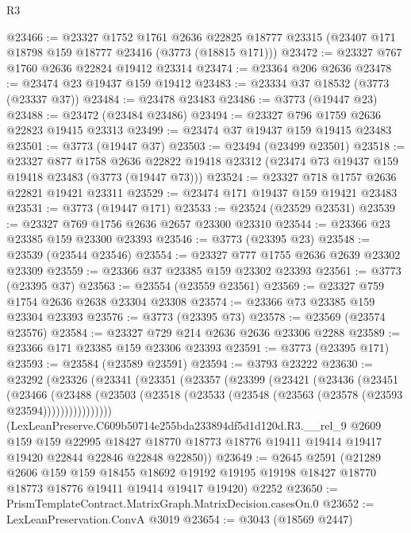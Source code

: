 \begin{lexlean}{R3}
\begin{coremodule}
@23466 := @23327
    @1752
    @1761
    @2636
    @22825
    @18777
    @23315
    (@23407 @171 @18798 @159 @18777 @23416 (@3773 (@18815 @171)))
@23472 := @23327 @767 @1760 @2636 @22824 @19412 @23314
@23474 := @23364 @206 @2636
@23478 := @23474 @23 @19437 @159 @19412
@23483 := @23334 @37 @18532 (@3773 (@23337 @37))
@23484 := @23478 @23483
@23486 := @3773 (@19447 @23)
@23488 := @23472 (@23484 @23486)
@23494 := @23327 @796 @1759 @2636 @22823 @19415 @23313
@23499 := @23474 @37 @19437 @159 @19415 @23483
@23501 := @3773 (@19447 @37)
@23503 := @23494 (@23499 @23501)
@23518 := @23327
    @877
    @1758
    @2636
    @22822
    @19418
    @23312
    (@23474 @73 @19437 @159 @19418 @23483 (@3773 (@19447 @73)))
@23524 := @23327 @718 @1757 @2636 @22821 @19421 @23311
@23529 := @23474 @171 @19437 @159 @19421 @23483
@23531 := @3773 (@19447 @171)
@23533 := @23524 (@23529 @23531)
@23539 := @23327 @769 @1756 @2636 @2657 @23300 @23310
@23544 := @23366 @23 @23385 @159 @23300 @23393
@23546 := @3773 (@23395 @23)
@23548 := @23539 (@23544 @23546)
@23554 := @23327 @777 @1755 @2636 @2639 @23302 @23309
@23559 := @23366 @37 @23385 @159 @23302 @23393
@23561 := @3773 (@23395 @37)
@23563 := @23554 (@23559 @23561)
@23569 := @23327 @759 @1754 @2636 @2638 @23304 @23308
@23574 := @23366 @73 @23385 @159 @23304 @23393
@23576 := @3773 (@23395 @73)
@23578 := @23569 (@23574 @23576)
@23584 := @23327 @729 @214 @2636 @2636 @23306 @2288
@23589 := @23366 @171 @23385 @159 @23306 @23393
@23591 := @3773 (@23395 @171)
@23593 := @23584 (@23589 @23591)
@23594 := @3793 @23222
@23630 := @23292
    (@23326
      (@23341
        (@23351
          (@23357
            (@23399
              (@23421
                (@23436
                  (@23451
                    (@23466
                      (@23488
                        (@23503
                          (@23518 (@23533 (@23548 (@23563 (@23578 (@23593 @23594))))))))))))))))
      (LexLeanPreserve.C609b50714e255bda233894df5d1d120d.R3.__rel_9
        @2609
        @159
        @159
        @22995
        @18427
        @18770
        @18773
        @18776
        @19411
        @19414
        @19417
        @19420
        @22844
        @22846
        @22848
        @22850))
@23649 := @2645
    @2591
    (@21289
      @2606
      @159
      @159
      @18455
      @18692
      @19192
      @19195
      @19198
      @18427
      @18770
      @18773
      @18776
      @19411
      @19414
      @19417
      @19420)
    @2252
@23650 := PrismTemplateContract.MatrixGraph.MatrixDecision.casesOn.{0}
@23652 := LexLeanPreservation.ConvA @3019
@23654 := @3043 (@18569 @2447)

\end{coremodule}
\end{lexlean}

